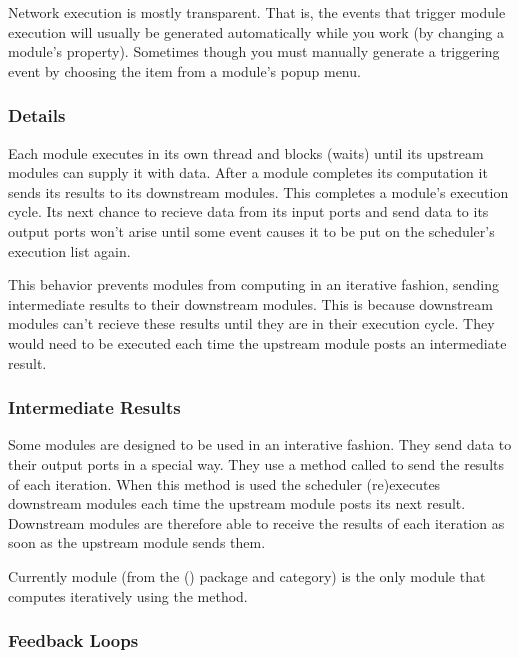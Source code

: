Network execution is mostly transparent.  That is, the events that trigger
module execution will usually be generated automatically while you work
(\eg by changing a module's property).  Sometimes though you must manually
generate a triggering event by choosing the  item from a
module's popup menu.

\subsubsection{Details}

Each module executes in its own thread and blocks (waits) until its upstream
modules can supply it with data.  After a module completes its computation
it sends its results to its downstream modules.  This completes a module's
execution cycle.  Its next chance to recieve data from its input ports
and send data to its output ports won't arise until some event
causes it to be put on the scheduler's execution list again.  

This behavior prevents modules from computing in an iterative fashion,
sending intermediate results to their downstream modules.  This is because
downstream modules can't recieve these results until they are in their
execution cycle.  They would need to be executed each time the
upstream module posts an intermediate result.


\subsubsection{Intermediate Results}

Some modules are designed to be used in an interative fashion.  They send
data to their output ports in a special way.  They use a method called
 to send the results of each iteration.  When
this method is used the scheduler (re)executes downstream modules each time
the upstream module posts its next result.  Downstream modules are
therefore able to receive the results of each iteration as soon as the
upstream module sends them.

Currently module  (from the \package(\sr) package and
 category) is the only module that computes iteratively
using the  method.

\subsubsection{Feedback Loops}

